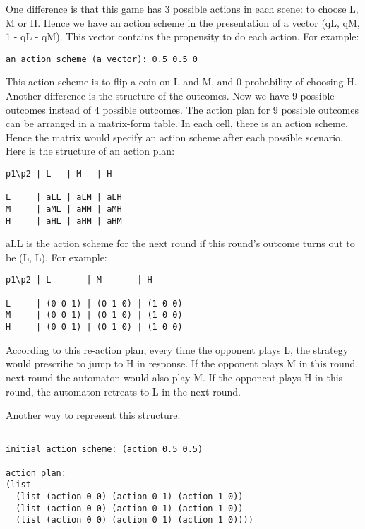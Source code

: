 \documentclass[12.5pt]{report}
\begin{document}
One difference is that this game has 3 possible actions in each scene: to choose L, M or H. Hence we have an action scheme in the presentation of a vector (qL, qM, 1 - qL - qM). This vector contains the propensity to do each action. For example:

\begin{verbatim}
an action scheme (a vector): 0.5 0.5 0
\end{verbatim}

This action scheme is to flip a coin on L and M, and 0 probability of choosing H.\\

Another difference is the structure of the outcomes. Now we have 9 possible outcomes instead of 4 possible outcomes. The action plan for 9 possible outcomes can be arranged in a matrix-form table. In each cell, there is an action scheme. Hence the matrix would specify an action scheme after each possible scenario. Here is the structure of an action plan:

\begin{verbatim}
p1\p2 | L   | M   | H
--------------------------
L     | aLL | aLM | aLH
M     | aML | aMM | aMH
H     | aHL | aHM | aHM

\end{verbatim}

aLL is the action scheme for the next round if this round's outcome turns out to be (L, L). For example:

\begin{verbatim}
p1\p2 | L       | M       | H
-------------------------------------
L     | (0 0 1) | (0 1 0) | (1 0 0)
M     | (0 0 1) | (0 1 0) | (1 0 0)
H     | (0 0 1) | (0 1 0) | (1 0 0)

\end{verbatim}


According to this re-action plan, every time the opponent plays L, the strategy would prescribe to jump to H in response. If the opponent plays M in this round, next round the automaton would also play M. If the opponent plays H in this round, the automaton retreats to L in the next round.

Another way to represent this structure:
\begin{verbatim}

initial action scheme: (action 0.5 0.5)

action plan:
(list
  (list (action 0 0) (action 0 1) (action 1 0))
  (list (action 0 0) (action 0 1) (action 1 0))
  (list (action 0 0) (action 0 1) (action 1 0))))


\end{verbatim}
\end{document}
